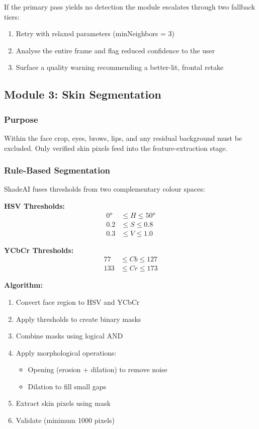If the primary pass yields no detection the module escalates through two fallback tiers:
\begin{enumerate}
    \item Retry with relaxed parameters (minNeighbors = 3)
    \item Analyse the entire frame and flag reduced confidence to the user
    \item Surface a quality warning recommending a better-lit, frontal retake
\end{enumerate}

\subsection{Module 3: Skin Segmentation}

\subsubsection{Purpose}
Within the face crop, eyes, brows, lips, and any residual background must be excluded. Only verified skin pixels feed into the feature-extraction stage.

\subsubsection{Rule-Based Segmentation}

ShadeAI fuses thresholds from two complementary colour spaces:

\textbf{HSV Thresholds:}
\begin{align}
    0° &\leq H \leq 50° \\
    0.2 &\leq S \leq 0.8 \\
    0.3 &\leq V \leq 1.0
\end{align}

\textbf{YCbCr Thresholds:}
\begin{align}
    77 &\leq Cb \leq 127 \\
    133 &\leq Cr \leq 173
\end{align}

\textbf{Algorithm:}
\begin{enumerate}
    \item Convert face region to HSV and YCbCr
    \item Apply thresholds to create binary masks
    \item Combine masks using logical AND
    \item Apply morphological operations:
    \begin{itemize}
        \item Opening (erosion + dilation) to remove noise
        \item Dilation to fill small gaps
    \end{itemize}
    \item Extract skin pixels using mask
    \item Validate (minimum 1000 pixels)
\end{enumerate}

